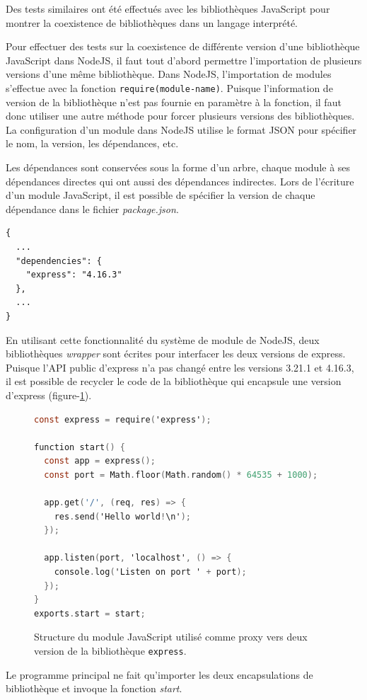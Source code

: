 Des tests similaires ont été effectués avec les bibliothèques JavaScript pour
montrer la coexistence de bibliothèques dans un langage interprété.

Pour effectuer des tests sur la coexistence de différente version d'une bibliothèque
JavaScript dans NodeJS, il faut tout d'abord permettre l'importation de plusieurs
versions d'une même bibliothèque. Dans NodeJS, l'importation de modules s'effectue
avec la fonction \verb|require(module-name)|. Puisque l'information de version
de la bibliothèque n'est pas fournie en paramètre à la fonction, il faut donc
utiliser une autre méthode pour forcer plusieurs versions des bibliothèques.
La configuration d'un module dans NodeJS utilise le format JSON pour spécifier
le nom, la version, les dépendances, etc.

Les dépendances sont conservées sous la forme d'un arbre, chaque module à ses dépendances directes
qui ont aussi des dépendances indirectes.  Lors de l'écriture d'un module JavaScript, il est possible
de spécifier la version de chaque dépendance dans le fichier \textit{package.json}.
\begin{verbatim}
{
  ...
  "dependencies": {
    "express": "4.16.3"
  },
  ...
}
\end{verbatim}
En utilisant cette fonctionnalité du système de module de NodeJS, deux bibliothèques \textit{wrapper}
sont écrites pour interfacer les deux versions de express. Puisque l'API public d'express n'a pas changé entre
les versions 3.21.1 et 4.16.3, il est possible de recycler le code de la bibliothèque qui encapsule une
version d'express (figure-\ref{fig:express}).
\begin{center}
\begin{figure}[ht]
    \begin{lstlisting}[language=C,frame=single]
const express = require('express');

function start() {
  const app = express();
  const port = Math.floor(Math.random() * 64535 + 1000);

  app.get('/', (req, res) => {
    res.send('Hello world!\n');
  });

  app.listen(port, 'localhost', () => {
    console.log('Listen on port ' + port);
  });
}
exports.start = start;
\end{lstlisting}
  \caption{Structure du module JavaScript utilisé comme proxy vers deux version
    de la bibliothèque \texttt{express}.}
  \label{fig:express}
\end{figure}
\end{center}
Le programme principal ne fait qu'importer les deux encapsulations de bibliothèque
et invoque la fonction \textit{start}.

